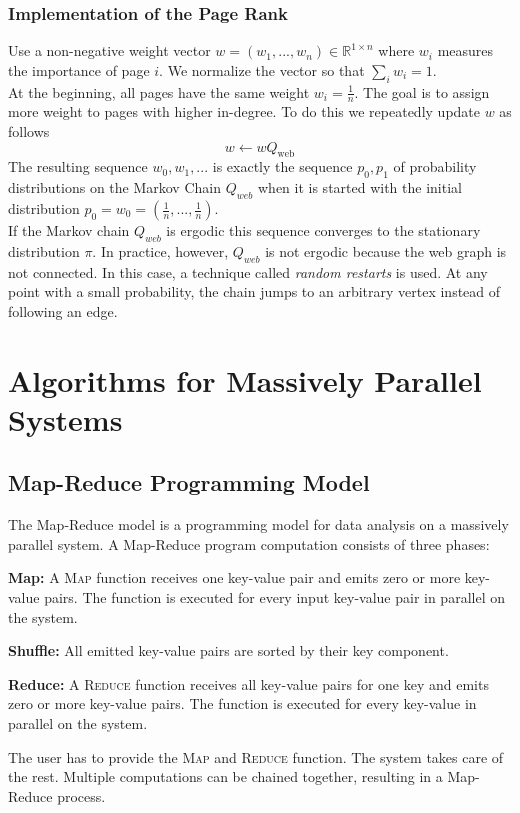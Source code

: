 \documentclass[english]{panikzettel}
\begin{document}
\subsubsection{Implementation of the Page Rank}
Use a non-negative weight vector $w=(w_1,...,w_n)\in\mathbb{R}^{1\times n}$ where $w_i$ measures the importance of page $i$. We normalize the vector so that $\sum_i w_i =1$.\\
At the beginning, all pages have the same weight $w_i=\frac{1}{n}$. The goal is to assign more weight to pages with higher in-degree. To do this we repeatedly update $w$ as follows
\[
w \leftarrow wQ_{\text{web}}
\]
The resulting sequence $w_0,w_1,...$ is exactly the sequence $p_0,p_1$ of probability distributions on the Markov Chain $Q_{web}$ when it is started with the initial distribution $p_0=w_0=(\frac{1}{n},...,\frac{1}{n})$.\\
If the Markov chain $Q_{web}$ is ergodic this sequence converges to the stationary distribution $\pi$.
In practice, however, $Q_{web}$ is not ergodic because the web graph is not connected.
In this case, a technique called \emph{random restarts} is used.
At any point with a small probability, the chain jumps to an arbitrary vertex instead of following an edge.


\section{Algorithms for Massively Parallel Systems}
\subsection{Map-Reduce Programming Model}
The Map-Reduce model is a programming model for data analysis on a massively parallel system.
A Map-Reduce program computation consists of three phases:

\textbf{Map:} A \textsc{Map} function receives one key-value pair and emits zero or more key-value pairs. The function is executed for every input key-value pair in parallel on the system.

\textbf{Shuffle:} All emitted key-value pairs are sorted by their key component.

\textbf{Reduce:} A \textsc{Reduce} function receives all key-value pairs for one key and emits zero or more key-value pairs. The function is executed for every key-value in parallel on the system.

The user has to provide the \textsc{Map} and \textsc{Reduce} function. The system takes care of the rest.
Multiple computations can be chained together, resulting in a Map-Reduce process.
\end{document}
